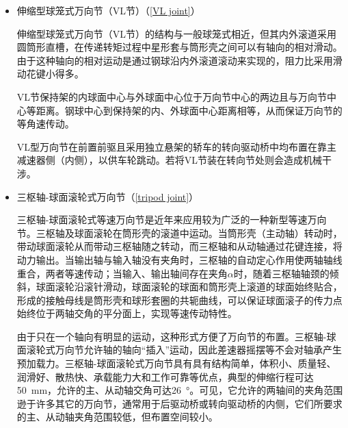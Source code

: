 \documentclass[UTF8]{ctexart}
\numberwithin{figure}{section}
\numberwithin{table}{section}
\begin{document}
\begin{itemize}
	      固定型球笼式万向节允许的输入、输出两轴间夹角较大，可达\qtyrange[range-phrase = $\,\sim\,$, range-units = single]{45}{50}{\degree}，且克服了球叉式万向节同一时刻仅有一半的传力钢球参与传力的缺点，在工作时无论传动方向如何，全部6个钢球均参与传力。与球叉式相比，它的承载能力强、结构紧凑、拆卸方便。越来越多车型中将RF节用于转向驱动桥的转向节处，因转向驱动桥要求主销轴线通过转向节中心以防止运动干涉。但此种万向节制造精度要求较高，成本略高。

	\item 伸缩型球笼式万向节（VL节）（\cref{VL joint}）

	      伸缩型球笼式万向节（VL节）的结构与一般球笼式相近，但其内外滚道采用圆筒形直槽，在传递转矩过程中星形套与筒形壳之间可以有轴向的相对滑动。由于这种轴向的相对运动是通过钢球沿内外滚道滚动来实现的，阻力比采用滑动花键小得多。

	      VL节保持架的内球面中心与外球面中心位于万向节中心的两边且与万向节中心等距离。钢球中心到保持架的内、外球面中心距离相等，从而保证万向节的等角速传动。

	      VL型万向节在前置前驱且采用独立悬架的轿车的转向驱动桥中均布置在靠主减速器侧（内侧），以供车轮跳动。若将VL节装在转向节处则会造成机械干涉。

	\item 三枢轴-球面滚轮式万向节（\cref{tripod joint}）

	      三枢轴-球面滚轮式等速万向节是近年来应用较为广泛的一种新型等速万向节。三枢轴及球面滚轮在筒形壳的滚道中运动。当筒形壳（主动轴）转动时，带动球面滚轮从而带动三枢轴随之转动，而三枢轴和从动轴通过花键连接，将动力输出。当输出轴与输入轴没有夹角时，三枢轴的自动定心作用使两轴轴线重合，两者等速传动；当输入、输出轴间存在夹角$\alpha$时，随着三枢轴轴颈的倾斜，球面滚轮沿滚针滑动，球面滚轮的球面和筒形壳上滚道的球面始终贴合，形成的接触母线是筒形壳和球形套圈的共轭曲线，可以保证球面滚子的传力点始终位于两轴交角的平分面上，实现等速传动特性。

	      由于只在一个轴向有明显的运动，这种形式方便了万向节的布置。三枢轴-球面滚轮式万向节允许轴的轴向“插入”运动，因此差速器摇摆等不会对轴承产生预加载力。三枢轴-球面滚轮式万向节具有具有结构简单，体积小、质量轻、润滑好、散热快、承载能力大和工作可靠等优点，典型的伸缩行程可达\SI{50}{\mm}，允许的主、从动轴交角可达\SI{26}{\degree}。可见，它允许的两轴间的夹角范围逊于许多其它的万向节，通常用于后驱动桥或转向驱动桥的内侧，它们所要求的主、从动轴夹角范围较低，但布置空间较小。
\end{itemize}
\end{document}
